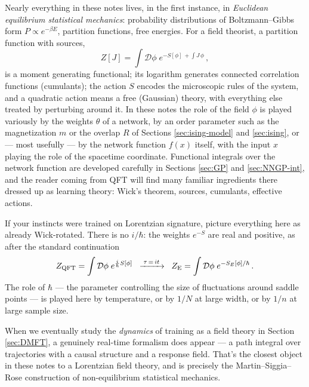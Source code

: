 \documentclass[11pt]{article}
\begin{document}
Nearly everything in these notes lives, in the first instance, in \emph{Euclidean equilibrium statistical mechanics}: probability distributions of Boltzmann--Gibbs form $P \propto e^{-\beta E}$, partition functions, free energies. For a field theorist, a partition function with sources,
%
\begin{equation}
    Z[J] = \int \mathcal{D}\phi\; e^{-S[\phi] \,+ \int J\,\phi}\,,
\end{equation}
%
is a moment generating functional; its logarithm generates connected correlation functions (cumulants); the action $S$ encodes the microscopic rules of the system, and a quadratic action means a free (Gaussian) theory, with everything else treated by perturbing around it. In these notes the role of the field $\phi$ is played variously by the weights $\theta$ of a network, by an order parameter such as the magnetization $m$ or the overlap $R$ of Sections \ref{sec:ising-model} and \ref{sec:ising}, or --- most usefully --- by the network function $f(x)$ itself, with the input $x$ playing the role of the spacetime coordinate. Functional integrals over the network function are developed carefully in Sections \ref{sec:GP} and \ref{sec:NNGP-int}, and the reader coming from QFT will find many familiar ingredients there dressed up as learning theory: Wick's theorem, sources, cumulants, effective actions.

If your instincts were trained on Lorentzian signature, picture everything here as already Wick-rotated. There is no $i/\hbar$: the weights $e^{-S}$ are real and positive, as after the standard continuation
%
\begin{equation}
    Z_{\rm QFT} =  \int \mathcal{D} \phi\; e^{\frac{i}{\hbar} S[\phi]} \;\;\xrightarrow{\;\tau\,=\,it\;}\;\; Z_{\rm E} = \int \mathcal{D} \phi\; e^{- S_E [\phi]/\hbar}\,.
\end{equation}
%
The role of $\hbar$ --- the parameter controlling the size of fluctuations around saddle points --- is played here by temperature, or by $1/N$ at large width, or by $1/n$ at large sample size.

When we eventually study the \emph{dynamics} of training as a field theory in Section \ref{sec:DMFT}, a genuinely real-time formalism does appear --- a path integral over trajectories with a causal structure and a response field. That's the closest object in these notes to a Lorentzian field theory, and is precisely the Martin--Siggia--Rose construction of non-equilibrium statistical mechanics.
\end{document}
